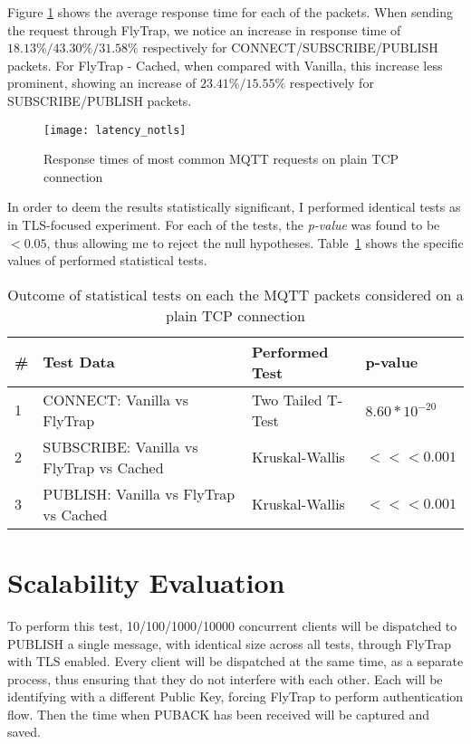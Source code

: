Figure \ref{fig:latency_notls} shows the average response time for each of the packets. When sending the request through FlyTrap, we notice an increase in response time of $18.13\%/43.30\%/31.58\%$ respectively for CONNECT/SUBSCRIBE/PUBLISH packets. For FlyTrap - Cached, when compared with Vanilla, this increase less prominent, showing an increase of $23.41\%/15.55\%$ respectively for SUBSCRIBE/PUBLISH packets. 
\begin{figure}[h]
    \centering
    \texttt{[image: latency\_notls]}
    \caption{Response times of most common MQTT requests on plain TCP connection}
    \label{fig:latency_notls}
\end{figure}

In order to deem the results statistically significant, I performed identical tests as in TLS-focused experiment. For each of the tests, the \textit{p-value} was found to be $<0.05$, thus allowing me to reject the null hypotheses. Table\ \ref{tab:ttest-notls} shows the specific values of performed statistical tests.

\begin{table}[h]
\centering
\begin{tabular}{|l|l|l|l|}
\hline
\textbf{\#} & \textbf{Test Data}                       & \textbf{Performed Test} & \textbf{p-value}                      \\ \hline
1           & CONNECT: Vanilla vs FlyTrap              & Two Tailed T-Test       & $8.60*10^{-20}$                    \\ \hline
2           & SUBSCRIBE: Vanilla vs FlyTrap vs Cached & Kruskal-Wallis          & $<<< 0.001$ \\ \hline
3           & PUBLISH: Vanilla vs FlyTrap vs Cached & Kruskal-Wallis          & $<<< 0.001$ \\ \hline
\end{tabular}
\caption{Outcome of statistical tests on each the MQTT packets considered on a plain TCP connection}
\label{tab:ttest-notls}
\end{table}


\section{Scalability Evaluation}
To perform this test, 10/100/1000/10000 concurrent clients will be dispatched to PUBLISH a single message, with identical size across all tests, through FlyTrap with TLS enabled. Every client will be dispatched at the same time, as a separate process, thus ensuring that they do not interfere with each other. Each will be identifying with a different Public Key, forcing FlyTrap to perform authentication flow. Then the time when PUBACK has been received will be captured and saved.

